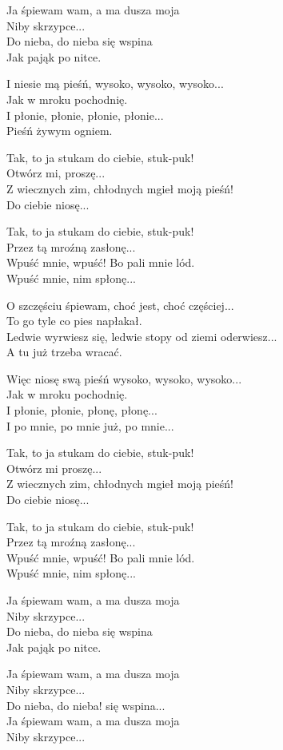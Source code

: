 \begin{text}
    Ja śpiewam wam, a ma dusza moja\\
    Niby skrzypce...\\
    Do nieba, do nieba się wspina\\
    Jak pająk po nitce.

    I niesie mą pieśń, wysoko, wysoko, wysoko...\\
    Jak w mroku pochodnię.\\
    I płonie, płonie, płonie, płonie...\\
    Pieśń żywym ogniem.

    Tak, to ja stukam do ciebie, stuk-puk!\\
    Otwórz mi, proszę...\\
    Z wiecznych zim, chłodnych mgieł moją pieśń!\\
    Do ciebie niosę...

    Tak, to ja stukam do ciebie, stuk-puk!\\
    Przez tą mroźną zasłonę...\\
    Wpuść mnie, wpuść! Bo pali mnie lód.\\
    Wpuść mnie, nim spłonę...

    O szczęściu śpiewam, choć jest, choć częściej...\\
    To go tyle co pies napłakał.\\
    Ledwie wyrwiesz się, ledwie stopy od ziemi oderwiesz...\\
    A tu już trzeba wracać.

    Więc niosę swą pieśń wysoko, wysoko, wysoko...\\
    Jak w mroku pochodnię.\\
    I płonie, płonie, płonę, płonę...\\
    I po mnie, po mnie już, po mnie...

    Tak, to ja stukam do ciebie, stuk-puk!\\
    Otwórz mi proszę...\\
    Z wiecznych zim, chłodnych mgieł moją pieśń!\\
    Do ciebie niosę...

    Tak, to ja stukam do ciebie, stuk-puk!\\
    Przez tą mroźną zasłonę...\\
    Wpuść mnie, wpuść! Bo pali mnie lód.\\
    Wpuść mnie, nim spłonę...

    Ja śpiewam wam, a ma dusza moja\\
    Niby skrzypce...\\
    Do nieba, do nieba się wspina\\
    Jak pająk po nitce.

    Ja śpiewam wam, a ma dusza moja\\
    Niby skrzypce...\\
    Do nieba, do nieba! się wspina...\\
    Ja śpiewam wam, a ma dusza moja\\
    Niby skrzypce...
\end{text}
\begin{chord}

\end{chord}